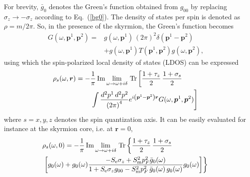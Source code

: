 \documentclass[twocolumn,showpacs,floatfix,nofootinbib,longbibliography]{revtex4-1}
\begin{document}
For brevity, $\bar g_{0}$ denotes the Green's function obtained from $g_{00}$ by replacing $\sigma_z \rightarrow - \sigma_z$ according to Eq.~(\ref{bg0}). The density of states per spin is denoted as $\rho = m/2\pi$. So, in the presence of the skyrmion, the Green's function becomes
\begin{align}
	G(\omega,\bm p^1,\bm p^2) =& g(\omega,\bm p^1)\,(2\pi)^2\delta(\bm p^1-\bm p^2) \nonumber \\ 
	          &  +g(\omega,\bm p^1) T(\bm p^1,\bm p^2) g(\omega,\bm p^2),
	\label{G}
\end{align}
using which the spin-polarized local density of states (LDOS) can be expressed
\begin{align}
	\rho_s(\omega,\bm r) = -&\frac{1}{\pi}\,{\rm Im}\lim_{\omega\rightarrow \omega+i\delta}{\rm\,Tr} \left[ \frac{1+\tau_z}{2}\,\frac{1+\sigma_s}{2} \right. \label{rhor} \\
	&\left.\int \frac{d^2p^1\,d^2p^2}{\left( 2\pi \right)^4} e^{i\left( \bm p^1-\bm p^2 \right)\bm r} G(\omega,\bm p^1,\bm p^2)\right]\, \nonumber 
\end{align}
where $s=x,y,z$ denotes the spin quantization axis. It can be easily evaluated for instance at the skyrmion core, i.e. at $\bm r=0$,
\begin{align}
	& \rho_s(\omega,0) = -\frac{1}{\pi}\,{\rm Im}\lim_{\omega\rightarrow \omega+i\delta}{\rm \,Tr} \left\{  \frac{1+\tau_z}{2}\,\frac{1+\sigma_s}{2}  \right. \label{spldos} \\
	&\left.\left[g_0(\omega)+g_0(\omega)  \frac{-S_{\rm e}\sigma_z+S^2_{\rm m}p_F^2\bar g_{0}(\omega)}{1+S_{\rm e}\sigma_zg_{00}-S^2_{\rm m}p_F^2\,\bar g_{0}(\omega)\, g_{0}(\omega)} g_0(\omega)  \right]\right\}\, \nonumber 
\end{align}
\end{document}
